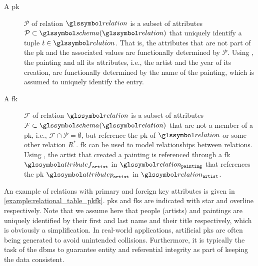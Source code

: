 \begin{description}
    \item[A \acrfull{pk}] $\mathcal{P}$ of relation $\relation$ is a subset of attributes $\mathcal{P} \subset \schema(\relation)$ that uniquely identify a tuple $t \in \relation$. That is, the attributes that are not part of the \acrshort{pk} and the associated values are functionally determined by $\mathcal{P}$. Using , the painting and all its attributes, i.e., the artist and the year of its creation, are functionally determined by the name of the painting, which is assumed to uniquely identify the entry.
 
    \item[A \acrfull{fk}] $\mathcal{F}$ of relation $\relation$ is a subset of attributes $\mathcal{F} \subset \schema(\relation)$ that are not a member of a \acrshort{pk}, i.e., $ \mathcal{F} \cap \mathcal{P} = \emptyset$, but reference the \acrshort{pk} of $\relation$ or some other relation $R^{*}$. \acrshort{fk} can be used to model relationships between relations. Using , the artist that created a painting is referenced through a \acrshort{fk} $\attributef_{\mathtt{artist}}$ in $\relation_{\mathtt{painting}}$ that references the \acrshort{pk} $\attributep_{\mathtt{artist}}$ in $\relation_{\mathtt{artist}}$.
\end{description}

An example of relations with primary and foreign key attributes is given in \cref{example:relational_table_pkfk}. \acrshort{pk}s and \acrshort{fk}s are indicated with star and overline respectively. Note that we assume here that people (artists) and paintings are uniquely identified by their first and last name and their title respectively, which is obviously a simplification. In real-world applications, artificial \acrshort{pk}s are often being generated to avoid unintended collisions. Furthermore, it is typically the task of the \acrshort{dbms} to guarantee entity and referential integrity as part of keeping the data consistent.

